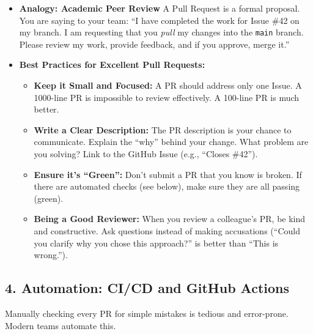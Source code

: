 \documentclass[
  letterpaper,
  DIV=11,
  numbers=noendperiod]{scrreprt}
\providecommand{\tightlist}{%
  \setlength{\itemsep}{0pt}\setlength{\parskip}{0pt}}
\begin{document}
\begin{itemize}
\item
  \textbf{Analogy: Academic Peer Review} A Pull Request is a formal
  proposal. You are saying to your team: ``I have completed the work for
  Issue \#42 on my branch. I am requesting that you \emph{pull} my
  changes into the \texttt{main} branch. Please review my work, provide
  feedback, and if you approve, merge it.''
\item
  \textbf{Best Practices for Excellent Pull Requests:}

  \begin{itemize}
  \tightlist
  \item
    \textbf{Keep it Small and Focused:} A PR should address only one
    Issue. A 1000-line PR is impossible to review effectively. A
    100-line PR is much better.
  \item
    \textbf{Write a Clear Description:} The PR description is your
    chance to communicate. Explain the ``why'' behind your change. What
    problem are you solving? Link to the GitHub Issue (e.g., ``Closes
    \#42'').
  \item
    \textbf{Ensure it's ``Green'':} Don't submit a PR that you know is
    broken. If there are automated checks (see below), make sure they
    are all passing (green).
  \item
    \textbf{Being a Good Reviewer:} When you review a colleague's PR, be
    kind and constructive. Ask questions instead of making accusations
    (``Could you clarify why you chose this approach?'' is better than
    ``This is wrong.'').
  \end{itemize}
\end{itemize}

\subsection{4. Automation: CI/CD and GitHub
Actions}\label{automation-cicd-and-github-actions}

Manually checking every PR for simple mistakes is tedious and
error-prone. Modern teams automate this.
\end{document}
